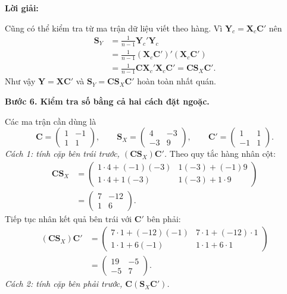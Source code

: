 \documentclass[11pt,a4paper]{article}
\newenvironment{solution}{%
  \par\medskip\noindent\textbf{Lời giải:}\par\nobreak\smallskip\noindent\ignorespaces
}{\par}
\newcommand{\step}[2]{\par\medskip\noindent\textbf{Bước #1. #2}\par\nopagebreak[4]\smallskip\noindent}
\begin{document}
\begin{solution}
\begin{enumerate}[label=\textbf{\alph*)}]
Cũng có thể kiểm tra từ ma trận dữ liệu viết theo hàng.
Vì $\mathbf{Y}_c=\mathbf{X}_c\mathbf{C}'$ nên
\begin{align*}
\mathbf{S}_Y
&=\frac1{n-1}\mathbf{Y}_c'\mathbf{Y}_c\\
&=\frac1{n-1}(\mathbf{X}_c\mathbf{C}')'
                  (\mathbf{X}_c\mathbf{C}')\\
&=\frac1{n-1}\mathbf{C}\mathbf{X}_c'\mathbf{X}_c\mathbf{C}'
=\mathbf{C}\mathbf{S}_X\mathbf{C}'.
\end{align*}
Như vậy $\mathbf{Y}=\mathbf{X}\mathbf{C}'$ và
$\mathbf{S}_Y=\mathbf{C}\mathbf{S}_X\mathbf{C}'$ hoàn toàn nhất quán.

\step{6}{Kiểm tra số bằng cả hai cách đặt ngoặc.}
Các ma trận cần dùng là
\[
\mathbf{C}=\begin{pmatrix}1&-1\\1&1\end{pmatrix},\qquad
\mathbf{S}_X=\begin{pmatrix}4&-3\\-3&9\end{pmatrix},\qquad
\mathbf{C}'=\begin{pmatrix}1&1\\-1&1\end{pmatrix}.
\]
\textit{Cách 1: tính cặp bên trái trước, $(\mathbf{C}\mathbf{S}_X)\mathbf{C}'$.}
Theo quy tắc hàng nhân cột:
\begin{align*}
\mathbf{C}\mathbf{S}_X
&=\begin{pmatrix}
1\cdot4+(-1)(-3)&1(-3)+(-1)9\\
1\cdot4+1(-3)&1(-3)+1\cdot9
\end{pmatrix}\\
&=\begin{pmatrix}7&-12\\1&6\end{pmatrix}.
\end{align*}
Tiếp tục nhân kết quả bên trái với $\mathbf{C}'$ bên phải:
\begin{align*}
(\mathbf{C}\mathbf{S}_X)\mathbf{C}'
&=\begin{pmatrix}
7\cdot1+(-12)(-1)&7\cdot1+(-12)\cdot1\\
1\cdot1+6(-1)&1\cdot1+6\cdot1
\end{pmatrix}\\
&=\begin{pmatrix}19&-5\\-5&7\end{pmatrix}.
\end{align*}
\textit{Cách 2: tính cặp bên phải trước, $\mathbf{C}(\mathbf{S}_X\mathbf{C}')$.}

\end{enumerate}
\end{solution}
\end{document}

